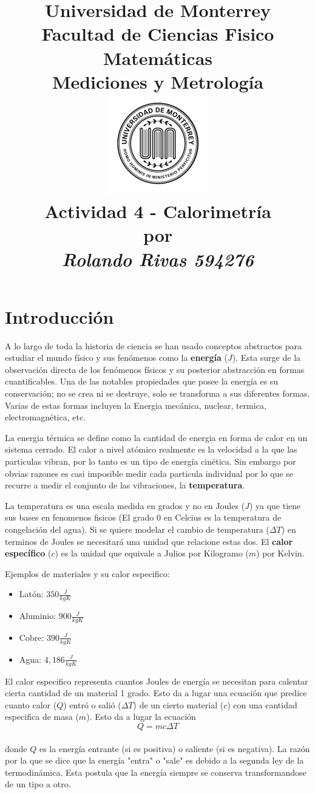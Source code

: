 \documentclass[a4paper,12pt]{article}
\author{}
\date{}
\title{\Large \textbf{Universidad de Monterrey}\\ Facultad de Ciencias Fisico Matemáticas \\ Mediciones y Metrología \\ \includegraphics{imagenes/UdemLogo.png} \\ \vspace{5mm} \LARGE \textbf{Actividad 4 - Calorimetría} \\ \vspace{1cm} \normalsize por \\ \vspace{1cm} \Large \textit{Rolando Rivas 594276}}
\begin{document}
\maketitle
\section*{Introducción}
A lo largo de toda la historia de ciencia se han usado conceptos abstractos para estudiar el mundo físico y sus fenómenos como la \textbf{energía} ($J$). Esta surge de la observación directa de los fenómenos físicos y su posterior abstracción en formas cuantificables. Una de las notables propiedades que posee la energía es su conservación; no se crea ni se destruye, solo se transforma a sus diferentes formas. Varias de estas formas incluyen la Energia mecánica, nuclear, termica, electromagnética, etc.

La energia térmica se define como la cantidad de energia en forma de calor en un sistema cerrado. El calor a nivel atómico realmente es la velocidad a la que las particulas vibran, por lo tanto es un tipo de energía cinética. Sin embargo por obvias razones es casi imposible medir cada particula individual por lo que se recurre a medir el conjunto de las vibraciones, la \textbf{temperatura}.

La temperatura es una escala medida en grados y no en Joules ($J$) ya que tiene sus bases en fenomenos fisicos (El grado 0 en Celcius es la temperatura de congelación del agua). Si se quiere modelar el cambio de temperatura ($\Delta T$) en terminos de Joules se necesitará una unidad que relacione estas dos. El \textbf{calor específico} ($c$) es la unidad que equivale a Julios por Kilogramo ($m$) por Kelvin. 

Ejemplos de materiales y su calor especifico:
\begin{itemize}
    \item Latón: $350 \frac{J}{kgK}$
    \item Aluminio: $900 \frac{J}{kgK}$
    \item Cobre: $390 \frac{J}{kgK}$
    \item Agua: $4,186 \frac{J}{kgK}$
\end{itemize}

El calor especifico representa cuantos Joules de energía se necesitan para calentar cierta cantidad de un material 1 grado. Esto da a lugar una ecuación que predice cuanto calor ($Q$) entró o salió ($\Delta T$) de un cierto material ($c$) con una cantidad especifica de masa ($m$). Esto da a lugar la ecuación
\[Q = mc\Delta T\]
\\
donde $Q$ es la energía entrante (si es positiva) o saliente (si es negativa). La razón por la que se dice que la energía "entra" o "sale" es debido a la segunda ley de la termodinámica. Esta postula que la energía siempre se conserva transformandose de un tipo a otro.
\\
\end{document}
